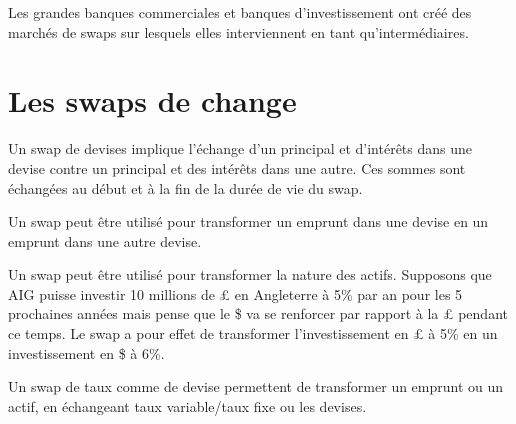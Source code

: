 	Les grandes banques commerciales et banques d'investissement ont créé des marchés de swaps sur lesquels elles interviennent en tant qu'intermédiaires. 

\section{Les swaps de change}

Un swap de devises implique l'échange d'un principal et d'intérêts dans une devise contre un principal et des intérêts dans une autre. Ces sommes sont échangées au début et à la fin de la durée de vie du swap.

Un swap peut être utilisé pour transformer un emprunt dans une devise en un emprunt dans une autre devise. 

Un swap peut être utilisé pour transformer la nature des actifs. Supposons que AIG puisse investir 10 millions de £ en Angleterre à 5\% par an pour les 5 prochaines années mais pense que le \$ va se renforcer par rapport à la £ pendant ce temps. Le swap a pour effet de transformer l'investissement en £ à 5\% en un investissement en \$ à 6\%.

Un swap de taux comme de devise permettent de transformer un emprunt ou un actif, en échangeant taux variable/taux fixe ou les devises.


